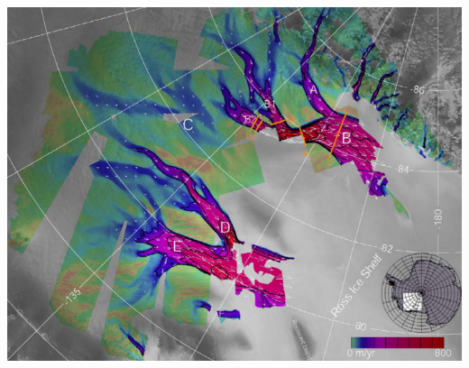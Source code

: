 \documentclass[hide notes,intlimits]{beamer}
\begin{document}
\begin{frame}
\begin{columns}
\begin{column}{0.5\textwidth}
\begin{center}

\includegraphics[height=0.45\textheight]{figs/siple}
\end{center}
\end{column}
\end{columns}
\end{frame}
\end{document}
